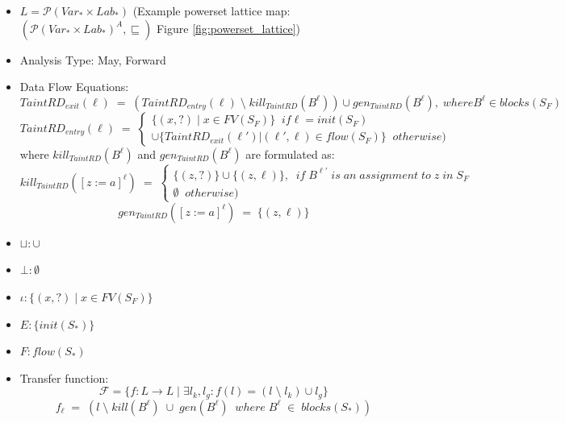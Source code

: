 \documentclass[english,12pt]{article}
\begin{document}
	\begin{itemize}
		\item $L = \mathcal{P}(Var_* \times Lab_*)$ \;\;(Example powerset lattice map:$(\mathcal{P}(Var_* \times Lab_*)^A,\sqsubseteq)$ Figure \ref{fig:powerset_lattice}) 
		\item Analysis Type: May, Forward
		\item Data Flow Equations:
		\begin{equation}
			TaintRD_{exit}(\ell)\;=\;(TaintRD_{entry}(\ell) \;\setminus\; kill_{TaintRD}(B^\ell)) \cup gen_{TaintRD}(B^\ell),\;where B^\ell \in blocks(S_F)  \label{eq:data_flow_equ_exit}
		\end{equation}
		\begin{equation}
			TaintRD_{entry}(\ell)\;=\;
			\begin{cases}
				\{(x,?)\;|\;x \in FV(S_F)\} \;\;if \ell = init(S_F) \\
				\cup \{TaintRD_{exit}(\ell') | (\ell', \ell) \in flow(S_F)\} \;\;otherwise)
			\end{cases} \label{eq:data_flow_equ_entry}
		\end{equation}
		where $kill_{TaintRD}(B^\ell)$ and $gen_{TaintRD}(B^\ell)$ are formulated as:
		\begin{equation}
			kill_{TaintRD}([z:=a]^\ell) \;=\; 
			\begin{cases}
				\{(z,?)\} \cup \{(z,\ell)\}, \;\;if\;B^{\ell'} \;is \;an \;assignment \;to \;z \;in \; S_F \\
				\emptyset \;\;otherwise)
			\end{cases} \label{eq:data_flow_equ_entry}
		\end{equation}
		\begin{equation}
			gen_{TaintRD}([z:=a]^\ell)\; =\; \{(z,\ell)\}
		\end{equation}
		\item $\sqcup: \cup$
		\item $\bot: \emptyset$
		\item $\iota: \{(x,?)\;|\;x \in FV(S_F)\}$
		\item $E: \{init(S_*)\}$
		\item $F: flow(S_*)$
		\item Transfer function: 
		\begin{equation}
			\mathcal{F} = \{ f : L \rightarrow L\;|\;\exists l_k, l_g : f(l) = (l\; \setminus \;l_k) \cup l_g\}
		\end{equation}
		\begin{equation}
			f_{\ell}\;=\;(l\; \setminus \;kill(B^\ell)\; \cup \;gen(B^\ell)\;\; where\;B^\ell \; \in \; blocks(S_*))
		\end{equation}
	\end{itemize}
	
\end{document}
